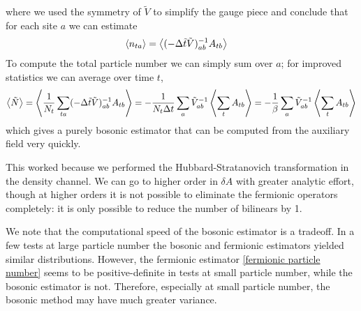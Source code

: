 where we used the symmetry of $\tilde{V}$ to simplify the gauge piece and conclude that for each site $a$ we can estimate
\begin{align}
	\left\langle n_{ta} \right\rangle &= \left\langle (-\Delta\tilde{t}\tilde{V})_{ab}^{-1} A_{tb} \right\rangle
\end{align}
To compute the total particle number we can simply sum over $a$; for improved statistics we can average over time $t$,
\begin{align}
	\left\langle \tilde{N} \right\rangle
	= \left\langle \frac{1}{N_t}\sum_{ta}(-\Delta\tilde{t}\tilde{V})_{ab}^{-1} A_{tb} \right\rangle
	= - \frac{1}{N_t \Delta t} \sum_a \tilde{V}_{ab}^{-1} \left\langle  \sum_t A_{tb} \right\rangle
	= - \frac{1}{\beta} \sum_a \tilde{V}_{ab}^{-1} \left\langle  \sum_t A_{tb} \right\rangle
	\label{eq:bosonic particle number}
\end{align}
which gives a purely bosonic estimator that can be computed from the auxiliary field very quickly.

This worked because we performed the Hubbard-Stratanovich transformation in the density channel.
We can go to higher order in $\delta A$ with greater analytic effort, though at higher orders it is not possible to eliminate the fermionic operators completely: it is only possible to reduce the number of bilinears by 1.

We note that the computational speed of the bosonic estimator is a tradeoff.
In a few tests at large particle number the bosonic and fermionic estimators yielded similar distributions.
However, the fermionic estimator \eqref{fermionic particle number} seems to be positive-definite in tests at small particle number, while the bosonic estimator is not.
Therefore, especially at small particle number, the bosonic method may have much greater variance.


